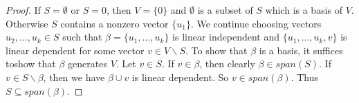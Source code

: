 \begin{proof}
	If $S= \emptyset$ or $S={0}$, then $V=\{0\}$ and $\emptyset$ is a subset of $S$ which is a basis of $V$. Otherwise $S$ contains a nonzero vector $\{u_1\}$. We continue choosing vectors $u_2,...,u_k \in S$ such that $\beta = \{u_1,...,u_k\}$ is linear independent and $\{u_1,...,u_k,v\}$ is linear dependent for some vector $v \in V \backslash S$. To show that $\beta$ is a basis, it suffices toshow that $\beta$ generates $V$. Let $v \in S$. If $v \in \beta$, then clearly $\beta \in span(S)$. If $v \in S \backslash \beta$, then we have $\beta \cup {v}$ is linear dependent. So $v \in span(\beta)$. Thus $S \subseteq span(\beta)$.
\end{proof}